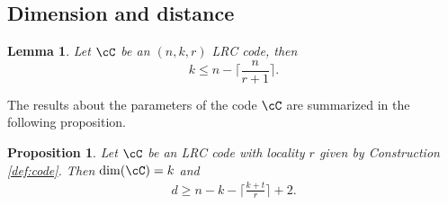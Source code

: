 \documentclass{IEEEtran}
\newtheorem{lemma}[theorem]{Lemma}
\newtheorem{proposition}[theorem]{Proposition}
\begin{document}
\subsection{Dimension and distance}
\begin{lemma}{\rm \cite[Thm.2.1]{OptimalLRC}}
Let $\cC$ be an $(n,k,r)$ LRC code, then
\begin{equation}
k\leq n- \Big\lceil \frac{n}{r+1} \Big\rceil.
\label{eq:stam}
\end{equation}
\end{lemma}

The results about the parameters of the code $\cC$ are summarized in the following proposition.

\begin{proposition}\label{lemma:degree}
 Let $\cC$ be an LRC code with locality $r$ given by Construction \ref{def:code}. Then $\dim(\cC)=k$ and
  \begin{align}\label{eq:dist}
  d\ge n-k-\Big\lceil\frac{k+t}{r}\Big\rceil+2.
  \end{align}
\end{proposition}
\end{document}
